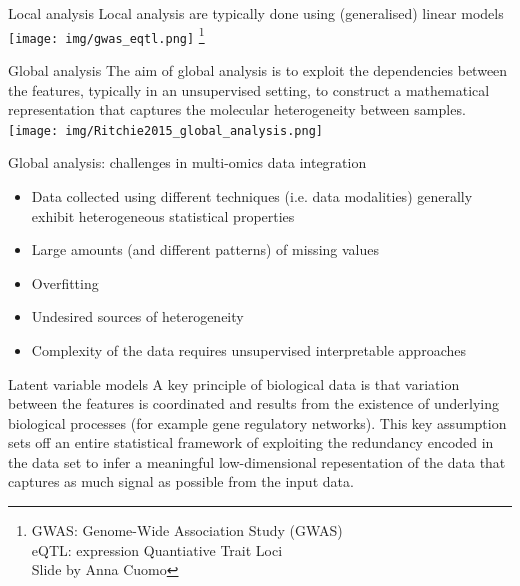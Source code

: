 \documentclass[aspectratio=169,notes]{beamer}
\newcommand\blfootnote[1]{%
  \begingroup
  \renewcommand\thefootnote{}\footnote{#1}%
  \addtocounter{footnote}{-1}%
  \endgroup
}
\begin{document}
	\begin{frame}{Local analysis}
	Local analysis are typically done using (generalised) linear models
	\centering
	\texttt{[image: img/gwas\_eqtl.png]}
	\blfootnote{GWAS: Genome-Wide Association Study (GWAS)\\eQTL: expression Quantiative Trait Loci\\Slide by Anna Cuomo}
	\end{frame}

	\begin{frame}{Global analysis}
	The aim of global analysis is to exploit the dependencies between the features, typically in an unsupervised setting, to construct a mathematical representation that captures the molecular heterogeneity between samples.\\
	\leavevmode\newline
	\centering
	\texttt{[image: img/Ritchie2015\_global\_analysis.png]}
	\end{frame}

	\begin{frame}{Global analysis: challenges in multi-omics data integration}
	\begin{itemize}
		\item Data collected using different techniques (i.e. data modalities) generally exhibit heterogeneous statistical properties
		\item Large amounts (and different patterns) of missing values
		\item Overfitting
		\item Undesired sources of heterogeneity
		\item Complexity of the data requires unsupervised interpretable approaches
	\end{itemize}
	\end{frame}

	\begin{frame}{Latent variable models}
	A key principle of biological data is that variation between the features is coordinated and results from the existence of underlying biological processes (for example gene regulatory networks). This key assumption sets off an entire statistical framework of exploiting the redundancy encoded in the data set to infer a meaningful low-dimensional repesentation of the data that captures as much signal as possible from the input data.
	\end{frame}
\end{document}
